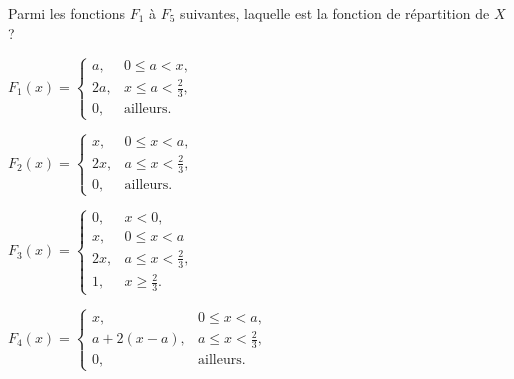 \begin{questions}

Parmi les fonctions $F_1$ à $F_5$ suivantes, laquelle est la fonction de répartition
   de $X$ ?

 \begin{checkboxes}
     

     \choice $F_1(x)=\left\{\begin{array}{ll}
     a, & 0\le a<x, \\ 
     2a, & x\le a < \frac{2}{3}, \\ 
     0, & \text{ailleurs}.
     \end{array}\right.$

     \vspace{0.3cm}
     \choice $F_2(x)=\left\{\begin{array}{ll}
     x, & 0\le x<a, \\ 
     2x, & a\le x < \frac{2}{3}, \\ 
     0, & \text{ailleurs}.
     \end{array}\right.$

     \vspace{0.3cm}
     \choice $F_3(x)=\left\{\begin{array}{ll}
     0, & x<0,\\
     x, & 0\le x<a \\ 2x, & a\le x < \frac{2}{3}, \\ 
     1, & x\ge\frac{2}{3}.
     \end{array}\right.$

\vspace{0.3cm}
     \choice $F_4(x)=\left\{\begin{array}{ll}
     x, & 0\le x<a, \\ 
     a+2(x-a), & a\le x < \frac{2}{3}, \\ 
     0, & \text{ailleurs}.
     \end{array}\right.$
     

\end{checkboxes}
\end{questions}
